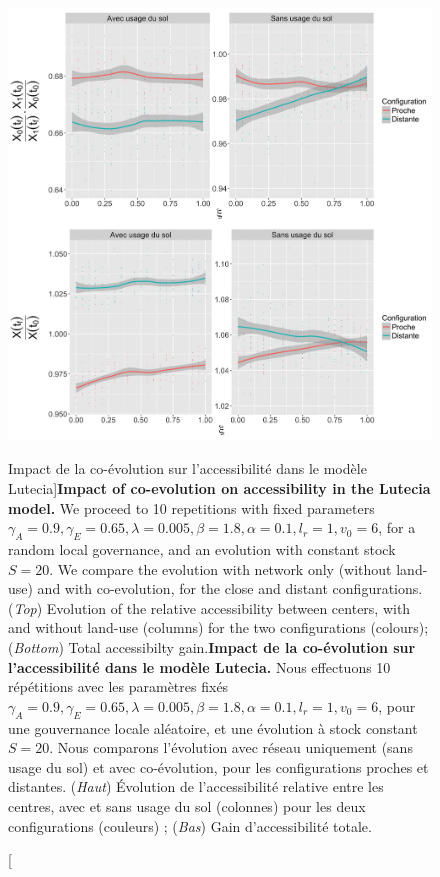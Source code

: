 \begin{figure}
	\includegraphics[width=\linewidth]{Figures/Final/7-3-3-fig-lutecia-coevol.jpg}
	\caption[Impact of co-evolution on accessibility in the Lutecia model][Impact de la co-évolution sur l'accessibilité dans le modèle Lutecia]{\textbf{Impact of co-evolution on accessibility in the Lutecia model.} We proceed to 10 repetitions with fixed parameters $\gamma_A = 0.9, \gamma_E = 0.65, \lambda = 0.005, \beta = 1.8, \alpha = 0.1, l_r = 1, v_0 = 6$, for a random local governance, and an evolution with constant stock $S=20$. We compare the evolution with network only (without land-use) and with co-evolution, for the close and distant configurations. (\textit{Top}) Evolution of the relative accessibility between centers, with and without land-use (columns) for the two configurations (colours); (\textit{Bottom}) Total accessibilty gain.\label{fig:lutecia:coevol}}{\textbf{Impact de la co-évolution sur l'accessibilité dans le modèle Lutecia.} Nous effectuons 10 répétitions avec les paramètres fixés $\gamma_A = 0.9, \gamma_E = 0.65, \lambda = 0.005, \beta = 1.8, \alpha = 0.1, l_r = 1, v_0 = 6$, pour une gouvernance locale aléatoire, et une évolution à stock constant $S=20$. Nous comparons l'évolution avec réseau uniquement (sans usage du sol) et avec co-évolution, pour les configurations proches et distantes. (\textit{Haut}) Évolution de l'accessibilité relative entre les centres, avec et sans usage du sol (colonnes) pour les deux configurations (couleurs) ; (\textit{Bas}) Gain d'accessibilité totale.\label{fig:lutecia:coevol}}
\end{figure}





